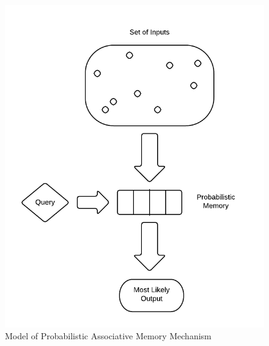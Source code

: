\documentclass{sig-alternate}
\begin{document}
\begin{figure}[H]
	\begin{center}
		\includegraphics[width=1\linewidth]{pammodel}
	\end{center}
	\vspace{-12pt}
	\caption{Model of Probabilistic Associative Memory Mechanism}
	\label{fig:pammodel}
\end{figure}

%
\end{document}

